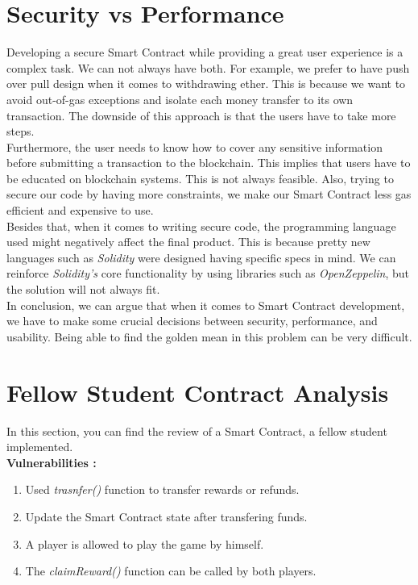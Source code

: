 \documentclass[12pt,a4paper]{article}
\begin{document}
\section*{Security vs Performance}
Developing a secure Smart Contract while providing a great user experience is a complex task. We can not always have both. For example, we prefer to have push over pull design when it comes to withdrawing ether. This is because we want to avoid out-of-gas exceptions and isolate each money transfer to its own transaction. The downside of this approach is that the users have to take more steps. \\

Furthermore, the user needs to know how to cover any sensitive information before submitting a transaction to the blockchain. This implies that users have to be educated on blockchain systems. This is not always feasible. Also, trying to secure our code by having more constraints, we make our Smart Contract less gas efficient and expensive to use. \\

Besides that, when it comes to writing secure code, the programming language used might negatively affect the final product. This is because pretty new languages such as \emph{Solidity} were designed having specific specs in mind. We can reinforce \emph{Solidity's} core functionality by using libraries such as \emph{OpenZeppelin}, but the solution will not always fit. \\

In conclusion, we can argue that when it comes to Smart Contract development, we have to make some crucial decisions between security, performance, and usability. Being able to find the golden mean in this problem can be very difficult. \\

\section*{Fellow Student Contract Analysis}

In this section, you can find the review of a Smart Contract, a fellow student implemented. \\

\textbf{Vulnerabilities :} 

\begin{enumerate}
    \item Used \emph{trasnfer()} function to transfer rewards or refunds.
    \item Update the Smart Contract state after transfering funds.
    \item A player is allowed to play the game by himself.
    \item The \emph{claimReward()} function can be called by both players.
\end{enumerate}
\end{document}
